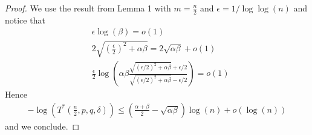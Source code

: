 \documentclass[english]{article}
\newcommand{\1}{\textbf{1}}
\begin{document}
\begin{proof}
We use the result from Lemma 1 with $m=\frac{n}{2}$ and $\epsilon=1/\log \log(n)$ and notice that
\begin{align*}
&\epsilon \log(\beta) = o(1)\\
&2\sqrt{ \left(\frac{\epsilon}{2} \right)^2+\alpha \beta} =2\sqrt{\alpha \beta} + o(1)\\
&\frac{\epsilon}{2} \log \left( \alpha \beta \frac{\sqrt{(\epsilon/2)^2 +\alpha \beta} +\epsilon/2}{\sqrt{(\epsilon/2)^2 +\alpha \beta} -\epsilon/2} \right) = o(1)
\end{align*}
Hence 
\begin{align*}
-\log(T^* \left( \frac{n}{2}, p,q, \delta \right)) \leq \left(\frac{\alpha +\beta}{2}-\sqrt{\alpha \beta} \right) \log(n) +o(\log(n))
\end{align*}
and we conclude.
\end{proof}
\end{document}
